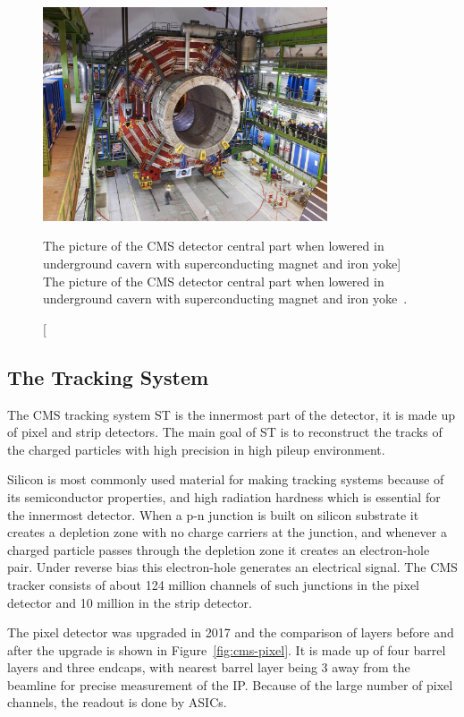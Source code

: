 \begin{figure}[!ht]
  \centering
  \includegraphics[width=0.75\textwidth]{figures/cms_magnet_lowered.jpg}
  \caption%
  [The picture of the CMS detector central part when lowered in underground
    cavern with superconducting magnet and iron
    yoke]%
  {The picture of the CMS detector central part when lowered in underground
    cavern with superconducting magnet and iron
    yoke~\cite{image-cms-magnet}.}%
  \label{fig:cms-magnet}
\end{figure}


\subsection{
  The Tracking System
}

The \gls{CMS} tracking system \gls{ST} is the innermost part of the detector, it
is made up of pixel and strip detectors. The main goal of \gls{ST} is to
reconstruct the tracks of the charged particles with high precision in high pileup
environment.

Silicon is most commonly used material for making tracking systems because of its
semiconductor properties, and high radiation hardness which is essential for the
innermost detector. When a p-n junction is built on silicon substrate it creates
a depletion zone with no charge carriers at the junction, and whenever
a charged particle passes through the depletion zone it creates an electron-hole pair.
Under reverse bias this electron-hole generates an electrical signal. The \gls{CMS}
tracker consists of about 124 million channels of such junctions in the
pixel detector and 10 million in the strip detector.

The pixel detector was upgraded in 2017 and the comparison of layers before
and after the upgrade is shown in Figure~\ref{fig:cms-pixel}. It is made up of
four barrel layers and three endcaps, with nearest barrel layer being 3\cm{}
away from the beamline for precise measurement of the \gls{IP}.
Because of the large number of pixel channels, the readout is done by \glspl{ASIC}.

